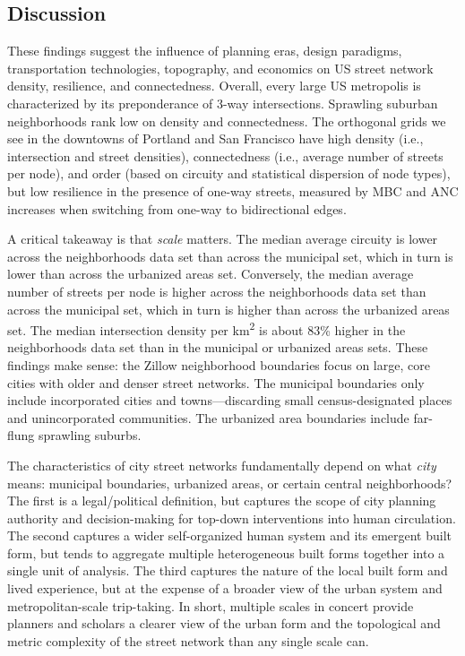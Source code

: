 \documentclass[11pt]{article}
\begin{document}
\begin{multicols}{2}
\section{Discussion}

These findings suggest the influence of planning eras, design paradigms, transportation technologies, topography, and economics on US street network density, resilience, and connectedness. Overall, every large US metropolis is characterized by its preponderance of 3-way intersections. Sprawling suburban neighborhoods rank low on density and connectedness. The orthogonal grids we see in the downtowns of Portland and San Francisco have high density (i.e., intersection and street densities), connectedness (i.e., average number of streets per node), and order (based on circuity and statistical dispersion of node types), but low resilience in the presence of one-way streets, measured by MBC and ANC increases when switching from one-way to bidirectional edges.

A critical takeaway is that \emph{scale} matters. The median average circuity is lower across the neighborhoods data set than across the municipal set, which in turn is lower than across the urbanized areas set. Conversely, the median average number of streets per node is higher across the neighborhoods data set than across the municipal set, which in turn is higher than across the urbanized areas set. The median intersection density per km\textsuperscript{2} is about 83\% higher in the neighborhoods data set than in the municipal or urbanized areas sets. These findings make sense: the Zillow neighborhood boundaries focus on large, core cities with older and denser street networks. The municipal boundaries only include incorporated cities and towns---discarding small census-designated places and unincorporated communities. The urbanized area boundaries include far-flung sprawling suburbs.

The characteristics of city street networks fundamentally depend on what \emph{city} means: municipal boundaries, urbanized areas, or certain central neighborhoods? The first is a legal/political definition, but captures the scope of city planning authority and decision-making for top-down interventions into human circulation. The second captures a wider self-organized human system and its emergent built form, but tends to aggregate multiple heterogeneous built forms together into a single unit of analysis. The third captures the nature of the local built form and lived experience, but at the expense of a broader view of the urban system and metropolitan-scale trip-taking. In short, multiple scales in concert provide planners and scholars a clearer view of the urban form and the topological and metric complexity of the street network than any single scale can.


\end{multicols}
\end{document}
